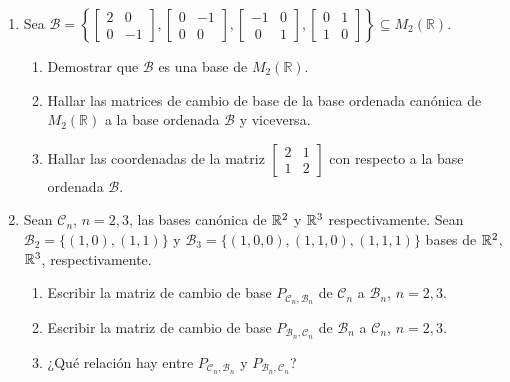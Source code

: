 \begin{enumerate}[topsep=6pt, itemsep=.4cm]
\item Sea $\mathcal{B}=
\left\{
\begin{bmatrix}
2 & 0\\
0 & -1
\end{bmatrix},
\begin{bmatrix}
0& -1\\
0& 0
\end{bmatrix},
\begin{bmatrix}
-1 &0\\
\; 0 & 1
\end{bmatrix},
\begin{bmatrix}
0 &1 \\
1 &0
\end{bmatrix}
\right\} \subseteq M_2(\mathbb R)$.



\begin{enumerate}
    \item Demostrar que $\mathcal{B}$ es una base de $M_2(\mathbb R)$.
    

    \item Hallar las matrices de cambio de base de la base ordenada can\'onica de $M_2(\mathbb R)$ a la base ordenada $\mathcal{B}$ y viceversa.
        
    \item Hallar las coordenadas de la matriz
    $
    \begin{bmatrix}
    2 & 1\\
    1 & 2
    \end{bmatrix}$ con respecto a la base ordenada $\mathcal{B}$.
\end{enumerate}


\item\label{otras bases} Sean $\mathcal{C}_n$, $n=2,3$, las bases canónica de $\mathbb R^2$ y $\mathbb R^3$ respectivamente. Sean
$\mathcal{B}_2=\{(1,0),(1,1)\}$ y $\mathcal{B}_3=\{(1,0,0),(1,1,0),(1,1,1)\}$ bases de $\mathbb R^2$, $\mathbb R^3$, respectivamente.
\begin{enumerate}
    \item Escribir la matriz de cambio de base $P_{{\mathcal{C}_n},{\mathcal{B}_n}}$ de $\mathcal{C}_n$ a $\mathcal{B}_n$, $n=2,3$.
    \item Escribir la matriz de cambio de base $P_{{\mathcal{B}_n},{\mathcal{C}_n}}$ de $\mathcal{B}_n$ a $\mathcal{C}_n$, $n=2,3$.
    \item ¿Qué relación hay entre $P_{{\mathcal{C}_n},{\mathcal{B}_n}}$ y $P_{{\mathcal{B}_n},{\mathcal{C}_n}}$?
\end{enumerate}



\end{enumerate}
